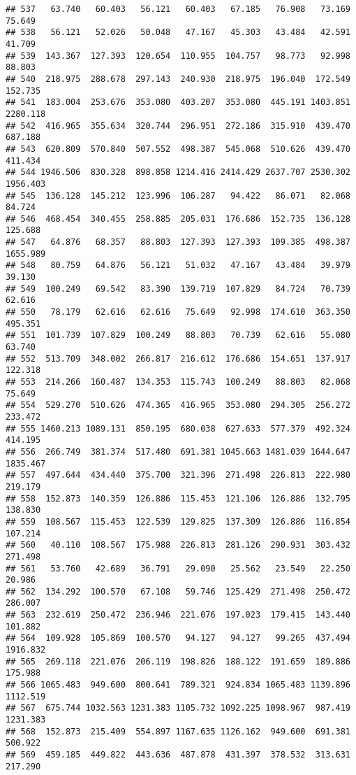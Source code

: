 \documentclass[
]{article}
\begin{document}
\begin{verbatim}
## 537   63.740   60.403   56.121   60.403   67.185   76.908   73.169   75.649
## 538   56.121   52.026   50.048   47.167   45.303   43.484   42.591   41.709
## 539  143.367  127.393  120.654  110.955  104.757   98.773   92.998   88.803
## 540  218.975  288.678  297.143  240.930  218.975  196.040  172.549  152.735
## 541  183.004  253.676  353.080  403.207  353.080  445.191 1403.851 2280.118
## 542  416.965  355.634  320.744  296.951  272.186  315.910  439.470  687.188
## 543  620.809  570.840  507.552  498.387  545.068  510.626  439.470  411.434
## 544 1946.506  830.328  898.858 1214.416 2414.429 2637.707 2530.302 1956.403
## 545  136.128  145.212  123.996  106.287   94.422   86.071   82.068   84.724
## 546  468.454  340.455  258.885  205.031  176.686  152.735  136.128  125.688
## 547   64.876   68.357   88.803  127.393  127.393  109.385  498.387 1655.989
## 548   80.759   64.876   56.121   51.032   47.167   43.484   39.979   39.130
## 549  100.249   69.542   83.390  139.719  107.829   84.724   70.739   62.616
## 550   78.179   62.616   62.616   75.649   92.998  174.610  363.350  495.351
## 551  101.739  107.829  100.249   88.803   70.739   62.616   55.080   63.740
## 552  513.709  348.002  266.817  216.612  176.686  154.651  137.917  122.318
## 553  214.266  160.487  134.353  115.743  100.249   88.803   82.068   75.649
## 554  529.270  510.626  474.365  416.965  353.080  294.305  256.272  233.472
## 555 1460.213 1089.131  850.195  680.038  627.633  577.379  492.324  414.195
## 556  266.749  381.374  517.480  691.381 1045.663 1481.039 1644.647 1835.467
## 557  497.644  434.440  375.700  321.396  271.498  226.813  222.980  219.179
## 558  152.873  140.359  126.886  115.453  121.106  126.886  132.795  138.830
## 559  108.567  115.453  122.539  129.825  137.309  126.886  116.854  107.214
## 560   40.110  108.567  175.988  226.813  281.126  290.931  303.432  271.498
## 561   53.760   42.689   36.791   29.090   25.562   23.549   22.250   20.986
## 562  134.292  100.570   67.108   59.746  125.429  271.498  250.472  286.007
## 563  232.619  250.472  236.946  221.076  197.023  179.415  143.440  101.882
## 564  109.928  105.869  100.570   94.127   94.127   99.265  437.494 1916.832
## 565  269.118  221.076  206.119  198.826  188.122  191.659  189.886  175.988
## 566 1065.483  949.600  800.641  789.321  924.834 1065.483 1139.896 1112.519
## 567  675.744 1032.563 1231.383 1105.732 1092.225 1098.967  987.419 1231.383
## 568  152.873  215.409  554.897 1167.635 1126.162  949.600  691.381  500.922
## 569  459.185  449.822  443.636  487.878  431.397  378.532  313.631  217.290

\end{verbatim}
\end{document}
